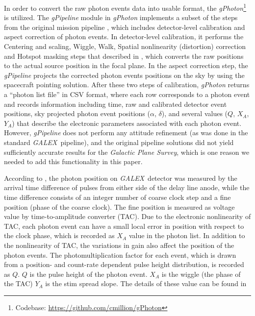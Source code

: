 \documentclass[12pt, preprint]{aastex61}
\newcommand{\project}[1]{\textsl{#1}}
\newcommand{\galex}{\project{GALEX}}
\begin{document}
In order to convert the raw photon events data into usable format, the \project{gPhoton}\footnote{Codebase: \url{https://github.com/cmillion/gPhoton} } \citep[][]{gPhoton_code} is utilized.
The \project{gPipeline} module in \project{gPhoton} implements a subset of the steps from the original mission pipeline \citep{galex_cal}, which includes detector-level calibration and aspect correction of photon events.
In detector-level calibration, it performs the Centering and scaling, Wiggle, Walk, Spatial nonlinearity (distortion) correction and Hotspot masking steps that described in \cite{galex_cal}, which converts the raw positions to the actual source position in the focal plane.
In the aspect correction step, the \project{gPipeline} projects the corrected photon events positions on the sky by using the spacecraft pointing solution.
After these two steps of calibration, \project{gPhoton} returns a “photon list file” in CSV format, where each row corresponds to a photon event and records information including time, raw and calibrated detector event positions, sky projected photon event positions ($\alpha$, $\delta$), and several values ($Q$, $X_A$, $Y_A$) that describe the electronic parameters associated with each photon event.
However, \project{gPipeline} does not perform any attitude refinement (as was done in the standard \galex\ pipeline), and the original pipeline solutions did not yield sufficiently accurate results for the \project{Galactic Plane Survey}, which is one reason we needed to add this functionality in this paper.

According to \cite{galex_cal}, the photon position on \galex\ detector was measured by the arrival time difference of pulses from either side of the delay line anode, while the time difference consists of an integer number of coarse clock step and a fine position (phase of the coarse clock).
The fine position is measured as voltage value by time-to-amplitude converter (TAC).
Due to the electronic nonlinearity of TAC, each photon event can have a small local error in position with respect to the clock phase, which is recorded as $X_A$ value in the photon list.
In addition to the nonlinearity of TAC, the variations in gain also affect the position of the photon events.
The photomultiplication factor for each event, which is drawn from a position- and count-rate dependent pulse height distribution, is recorded as $Q$.
$Q$ is the pulse height of the photon event.
$X_A$ is the wiggle (the phase of the TAC)
$Y_A$ is the stim spread slope.
The details of these value can be found in \cite{galex_cal}
\end{document}

